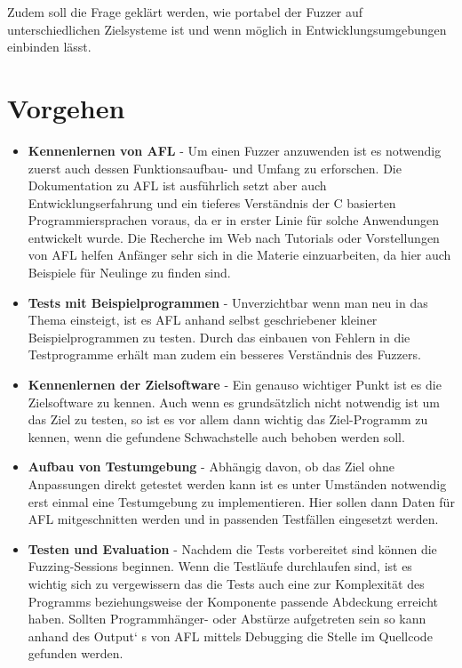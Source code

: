 \documentclass[12pt,a4paper]{scrreprt}
\begin{document}
Zudem soll die Frage geklärt werden, wie portabel der Fuzzer auf unterschiedlichen Zielsysteme ist und wenn möglich in Entwicklungsumgebungen einbinden lässt. 


\chapter{Vorgehen}

\begin{itemize}

\item \textbf{Kennenlernen von AFL} - Um einen Fuzzer anzuwenden ist es notwendig zuerst auch dessen Funktionsaufbau- und Umfang zu erforschen. Die Dokumentation zu AFL ist ausführlich setzt aber auch Entwicklungserfahrung und ein tieferes Verständnis der C basierten Programmiersprachen voraus, da er in erster Linie für solche Anwendungen entwickelt wurde. Die Recherche im Web nach Tutorials oder Vorstellungen von AFL helfen Anfänger sehr sich in die Materie einzuarbeiten, da hier auch Beispiele für Neulinge zu finden sind.

\vspace{1cm}

\item \textbf{Tests mit Beispielprogrammen} - Unverzichtbar wenn man neu in das Thema einsteigt, ist es AFL anhand selbst geschriebener kleiner Beispielprogrammen zu testen. Durch das einbauen von Fehlern in die Testprogramme erhält man zudem ein besseres Verständnis des Fuzzers.

\vspace{1cm}

\item \textbf{Kennenlernen der Zielsoftware} - Ein genauso wichtiger Punkt ist es die Zielsoftware zu kennen. Auch wenn es grundsätzlich nicht notwendig ist um das Ziel zu testen, so ist es vor allem dann wichtig das Ziel-Programm zu kennen, wenn die gefundene Schwachstelle auch behoben werden soll.

\vspace{1cm}

\item \textbf{Aufbau von Testumgebung} - Abhängig davon, ob das Ziel ohne Anpassungen direkt getestet werden kann ist es unter Umständen notwendig erst einmal eine Testumgebung zu implementieren. Hier sollen dann Daten für AFL mitgeschnitten werden und in passenden Testfällen eingesetzt werden.

\vspace{1cm}

\item \textbf{Testen und Evaluation} - Nachdem die Tests vorbereitet sind können die Fuzzing-Sessions beginnen. Wenn die Testläufe durchlaufen sind, ist es wichtig sich zu vergewissern das die Tests auch eine zur Komplexität des Programms beziehungsweise der Komponente passende Abdeckung erreicht haben. Sollten Programmhänger- oder Abstürze aufgetreten sein so kann anhand des Output` s von AFL mittels Debugging die Stelle im Quellcode gefunden werden.

\end{itemize}
\end{document}
